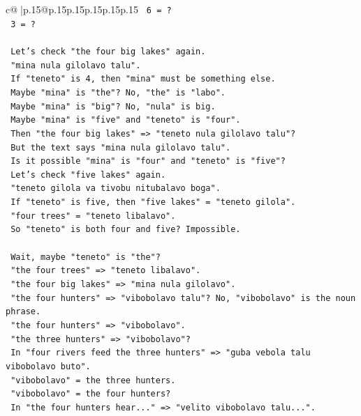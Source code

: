 \documentclass{article}
\begin{document}
{\begin{supertabular}{c@{$\;$}|p{.15\linewidth}@{}p{.15\linewidth}p{.15\linewidth}p{.15\linewidth}p{.15\linewidth}p{.15\linewidth}}
{{{\texttt{   6 = ?} \\
\texttt{   3 = ?} \\
\\ 
\texttt{   Let's check "the four big lakes" again.} \\
\texttt{   "mina nula gilolavo talu".} \\
\texttt{   If "teneto" is 4, then "mina" must be something else.} \\
\texttt{   Maybe "mina" is "the"? No, "the" is "labo".} \\
\texttt{   Maybe "mina" is "big"? No, "nula" is big.} \\
\texttt{   Maybe "mina" is "five" and "teneto" is "four".} \\
\texttt{   Then "the four big lakes" => "teneto nula gilolavo talu"?} \\
\texttt{   But the text says "mina nula gilolavo talu".} \\
\texttt{   Is it possible "mina" is "four" and "teneto" is "five"?} \\
\texttt{   Let's check "five lakes" again.} \\
\texttt{   "teneto gilola va tivobu nitubalavo boga".} \\
\texttt{   If "teneto" is five, then "five lakes" = "teneto gilola".} \\
\texttt{   "four trees" = "teneto libalavo".} \\
\texttt{   So "teneto" is both four and five? Impossible.} \\
\\ 
\texttt{   Wait, maybe "teneto" is "the"?} \\
\texttt{   "the four trees" => "teneto libalavo".} \\
\texttt{   "the four big lakes" => "mina nula gilolavo".} \\
\texttt{   "the four hunters" => "vibobolavo talu"? No, "vibobolavo" is the noun phrase.} \\
\texttt{   "the four hunters" => "vibobolavo".} \\
\texttt{   "the three hunters" => "vibobolavo"?} \\
\texttt{   In "four rivers feed the three hunters" => "guba vebola talu vibobolavo buto".} \\
\texttt{   "vibobolavo" = the three hunters.} \\
\texttt{   "vibobolavo" = the four hunters?} \\
\texttt{   In "the four hunters hear..." => "velito vibobolavo talu...".} \\
}}}
\end{supertabular}}
\end{document}
